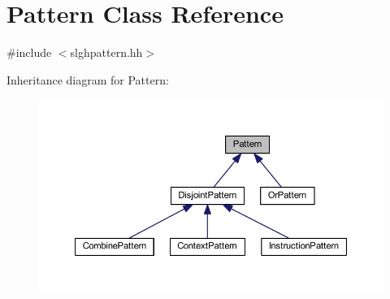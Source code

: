 \hypertarget{class_pattern}{}\section{Pattern Class Reference}
\label{class_pattern}


{\ttfamily \#include $<$slghpattern.\+hh$>$}



Inheritance diagram for Pattern\+:
\nopagebreak
\begin{figure}[H]
\begin{center}
\leavevmode
\includegraphics[width=350pt]{class_pattern__inherit__graph}
\end{center}
\end{figure}
